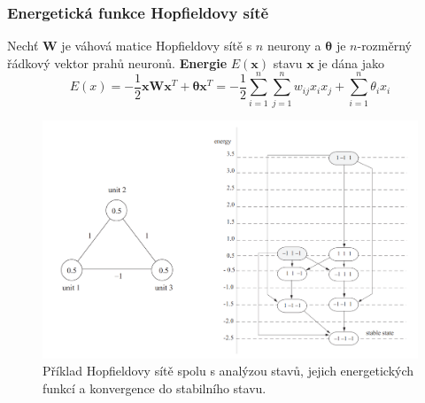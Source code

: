 \documentclass[11pt]{report} %
\renewcommand{\vec}[1]{\mathbf{#1}}
\numberwithin{equation}{section}
\begin{document}
\subsubsection{Energetická funkce Hopfieldovy sítě}
Nechť $\vec{W}$ je váhová matice Hopfieldovy sítě s $n$ neurony a $\vec{\theta}$ je $n$-rozměrný řádkový vektor prahů neuronů. \textbf{Energie} $E(\vec{x})$ stavu $\vec{x}$ je dána jako
$$E(x) = -\frac{1}{2}\vec{x}\vec{W}\vec{x}^T + \vec{\theta}\vec{x}^T = - \frac{1}{2}\sum\limits_{i=1}^{n}\sum\limits_{j=1}^{n} w_{ij} x_i x_j + \sum\limits_{i = 1}^{n}\theta_ix_i$$

\begin{figure}[H]
	\centering
	\includegraphics[width=\textwidth]{img/hopfield.png}
	\caption{Příklad Hopfieldovy sítě spolu s analýzou stavů, jejich energetických funkcí a konvergence do stabilního stavu.}
\end{figure}
\end{document}
